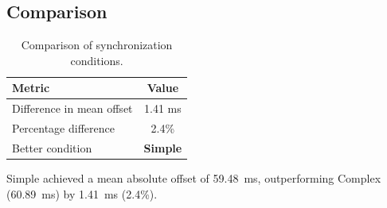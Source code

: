 \subsection*{Comparison}

\begin{table}[h!]
\centering
\begin{tabular}{|l|c|}
\hline
Metric & Value \\
\hline
Difference in mean offset & 1.41 ms \\
Percentage difference & 2.4\% \\
Better condition & \textbf{Simple} \\
\hline
\end{tabular}
\caption{Comparison of synchronization conditions.}
\label{tab:sync_comparison}
\end{table}

Simple achieved a mean absolute offset of 59.48~ms, outperforming Complex (60.89~ms) by 1.41~ms (2.4\%).
